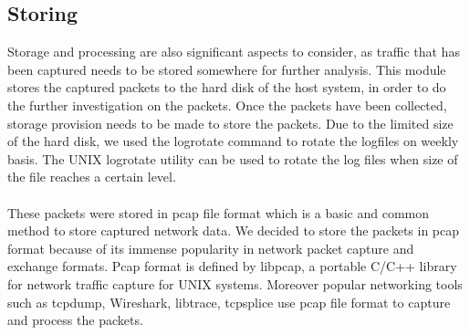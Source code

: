 \subsection{Storing}
Storage and processing are also significant aspects to consider, as traffic that has been captured needs to be stored somewhere for further analysis.
This module stores the captured packets to the hard disk of the host system, in order to do the further investigation on the packets.
Once the packets have been collected, storage provision needs to be made to store the packets.
Due to the limited size of the hard disk, we used the logrotate command to rotate the logfiles on weekly basis.
The UNIX logrotate utility can be used to rotate the log files when size of the file reaches a certain level.\\\\
These packets were stored in pcap file format which is a basic and common method to store captured network data.
We decided to store the packets in pcap format because of its immense popularity in network packet capture and exchange formats.
Pcap format is defined by libpcap, a portable C/C++ library for network traffic capture for UNIX systems.
Moreover popular networking tools such as tcpdump, Wireshark, libtrace, tcpsplice use pcap file format to capture and process the packets.
